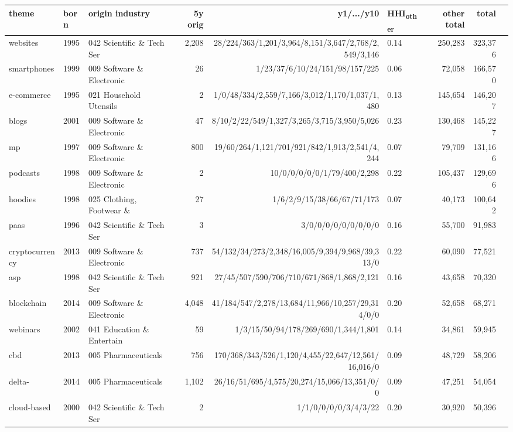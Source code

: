 {\scriptsize
\begin{tabular}{llp{3.2cm}rrp{3.4cm}rrr}
\toprule
theme & born & origin industry & 5y orig & y1/.../y10 & HHI\textsubscript{other} & other total & total \\
\midrule
websites & 1995 & 042 Scientific \& Tech Ser & 2,208 & 28/224/363/1,201/3,964/8,151/3,647/2,768/2,549/3,146 & 0.14 & 250,283 & 323,376 \\
smartphones & 1999 & 009 Software \& Electronic & 26 & 1/23/37/6/10/24/151/98/157/225 & 0.06 & 72,058 & 166,570 \\
e-commerce & 1995 & 021 Household Utensils & 2 & 1/0/48/334/2,559/7,166/3,012/1,170/1,037/1,480 & 0.13 & 145,654 & 146,207 \\
blogs & 2001 & 009 Software \& Electronic & 47 & 8/10/2/22/549/1,327/3,265/3,715/3,950/5,026 & 0.23 & 130,468 & 145,227 \\
mp & 1997 & 009 Software \& Electronic & 800 & 19/60/264/1,121/701/921/842/1,913/2,541/4,244 & 0.07 & 79,709 & 131,166 \\
podcasts & 1998 & 009 Software \& Electronic & 2 & 10/0/0/0/0/0/1/79/400/2,298 & 0.22 & 105,437 & 129,696 \\
hoodies & 1998 & 025 Clothing, Footwear \&  & 27 & 1/6/2/9/15/38/66/67/71/173 & 0.07 & 40,173 & 100,642 \\
paas & 1996 & 042 Scientific \& Tech Ser & 3 & 3/0/0/0/0/0/0/0/0/0 & 0.16 & 55,700 & 91,983 \\
cryptocurrency & 2013 & 009 Software \& Electronic & 737 & 54/132/34/273/2,348/16,005/9,394/9,968/39,313/0 & 0.22 & 60,090 & 77,521 \\
asp & 1998 & 042 Scientific \& Tech Ser & 921 & 27/45/507/590/706/710/671/868/1,868/2,121 & 0.16 & 43,658 & 70,320 \\
blockchain & 2014 & 009 Software \& Electronic & 4,048 & 41/184/547/2,278/13,684/11,966/10,257/29,314/0/0 & 0.20 & 52,658 & 68,271 \\
webinars & 2002 & 041 Education \& Entertain & 59 & 1/3/15/50/94/178/269/690/1,344/1,801 & 0.14 & 34,861 & 59,945 \\
cbd & 2013 & 005 Pharmaceuticals & 756 & 170/368/343/526/1,120/4,455/22,647/12,561/16,016/0 & 0.09 & 48,729 & 58,206 \\
delta- & 2014 & 005 Pharmaceuticals & 1,102 & 26/16/51/695/4,575/20,274/15,066/13,351/0/0 & 0.09 & 47,251 & 54,054 \\
cloud-based & 2000 & 042 Scientific \& Tech Ser & 2 & 1/1/0/0/0/0/3/4/3/22 & 0.20 & 30,920 & 50,396 \\

\end{tabular}}
